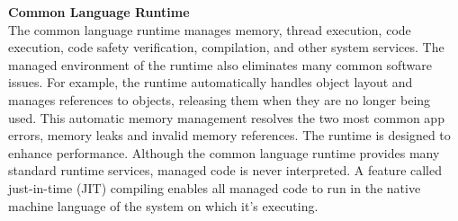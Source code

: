 \textbf{Common Language Runtime \cite{software:CLR}} \\
The common language runtime manages memory, thread execution, code execution, code safety verification, compilation, and other system services. 
The managed environment of the runtime also eliminates many common software issues. For example, the runtime automatically handles object layout and manages references to objects, releasing them when they are no longer being used. This automatic memory management resolves the two most common app errors, memory leaks and invalid memory references.
The runtime is designed to enhance performance. Although the common language runtime provides many standard runtime services, managed code is never interpreted. A feature called just-in-time (JIT) compiling enables all managed code to run in the native machine language of the system on which it's executing.

